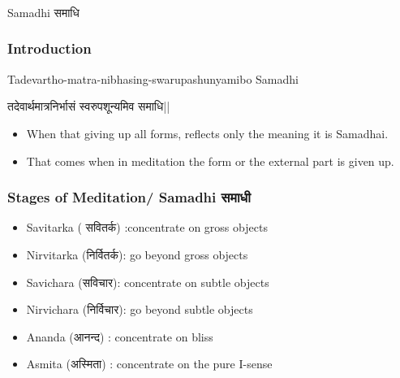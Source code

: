 \begin{frame}[fragile]\frametitle{}
\begin{center}
{\Large Samadhi समाधि}
\end{center}
\end{frame}

\begin{frame}[fragile]\frametitle{Introduction}

Tadevartho-matra-nibhasing-swarupashunyamibo Samadhi

तदेवार्थमात्रनिर्भासं स्वरुपशून्यमिव समाधि||

	\begin{itemize}
	\item When that giving up all forms, 
reflects  only  the  meaning  it  is 
Samadhai. 
	\item That comes when in 
meditation  the  form  or  the 
external part is given up.
	\end{itemize}

\end{frame}


\begin{frame}[fragile]\frametitle{Stages of Meditation/ Samadhi समाधी}


	\begin{itemize}
	\item Savitarka ( सवितर्क) :concentrate on gross objects
	\item  Nirvitarka (निर्वितर्क): go beyond gross objects
	\item  Savichara (सविचार): concentrate on subtle objects
	\item  Nirvichara (निर्विचार): go beyond subtle objects
	\item  Ananda (आनन्द) : concentrate on bliss
	\item  Asmita (अस्मिता) : concentrate on the pure I-sense
	\end{itemize}

\end{frame}


